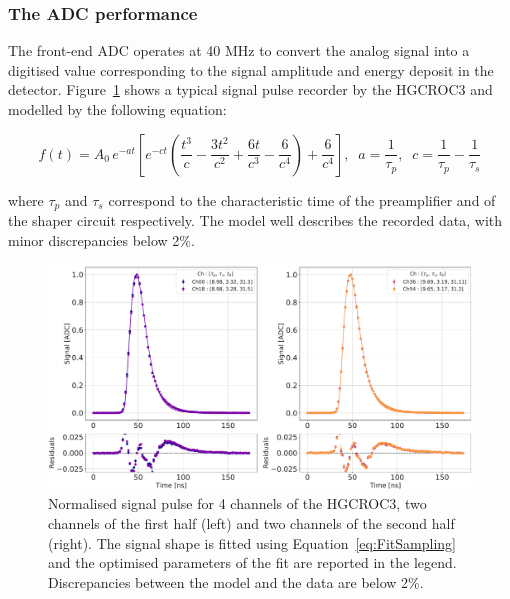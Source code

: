 \subsubsection{The ADC performance}
\label{subsubsec:The ADC performance}

The front-end ADC operates at 40 MHz to convert the analog signal into a digitised value corresponding to the signal amplitude and energy deposit in the detector. 
Figure~\ref{fig:FitSampling} shows a typical signal pulse recorder by the HGCROC3 and modelled by the following equation:

\begin{equation}
    f(t) = A_{0}\,e^{-at}\left[e^{-ct}\left(\frac{t^3}{c}-\frac{3t^2}{c^2}+\frac{6t}{c^3}-\frac{6}{c^4}\right)+\frac{6}{c^4}\right], \;\; a =\frac{1}{\tau_{p}}, \;\; c=\frac{1}{\tau_{p}}-\frac{1}{\tau_{s}}
\label{eq:FitSampling}
\end{equation}

where $\tau_{p}$ and $\tau_{s}$ correspond to the characteristic time of the preamplifier and of the shaper circuit respectively.
The model well describes the recorded data, with minor discrepancies below 2\%.

\begin{figure}
    \centering
    \includegraphics[width=0.75\linewidth]{Figures/HGCAL/FitSampling.pdf}
    \caption{Normalised signal pulse for 4 channels of the HGCROC3, two channels of the first half (left) and two channels of the second half (right). The signal shape is fitted using Equation~\ref{eq:FitSampling} and the optimised parameters of the fit are reported in the legend. Discrepancies between the model and the data are below 2\%.}
    \label{fig:FitSampling}
\end{figure}

\bigbreak

